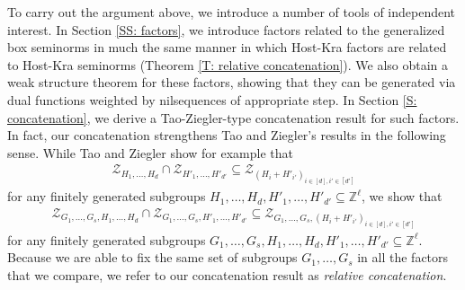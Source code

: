 \documentclass[11pt]{amsart}
\theoremstyle{definition}
\newcommand{\Z}{{\mathbb Z}}
\newcommand{\1}{{\mathbf{1}}}
\begin{document}
To carry out the argument above, we introduce a number of tools of independent interest. In Section \ref{SS: factors}, we introduce factors related to the generalized box seminorms in much the same manner in which Host-Kra factors are related to Host-Kra seminorms (Theorem \ref{T: relative concatenation}). We also obtain a weak structure theorem for these factors, showing that they can be generated via dual functions weighted by nilsequences of appropriate step. In Section \ref{S: concatenation}, we derive a Tao-Ziegler-type concatenation result for such factors. In fact, our concatenation strengthens Tao and Ziegler's results \cite{TZ16} in the following sense. While Tao and Ziegler show for example that 
\begin{align*}
    \mathcal{Z}_{H_{1},\dots,H_{d}}\cap \mathcal{Z}_{H'_{1},\dots,H'_{d'}}\subseteq \mathcal{Z}_{(H_{i}+H'_{i'})_{i\in[d], i'\in[d']}}
\end{align*}
for any finitely generated subgroups $H_1, \ldots, H_d, H'_1, \ldots, H'_{d'}\subseteq\Z^\ell$, we show that
\begin{align*}
    \mathcal{Z}_{G_{1},\dots,G_s,H_{1},\dots,H_{d}}\cap \mathcal{Z}_{G_{1},\dots,G_s,H'_{1},\dots,H'_{d'}}\subseteq \mathcal{Z}_{G_{1},\dots,G_{s},(H_{i}+H'_{i'})_{i\in[d], i'\in[d']}}
\end{align*}
for any finitely generated subgroups $G_1, \ldots, G_s, H_1, \ldots, H_d, H'_1, \ldots, H'_{d'}\subseteq\Z^\ell$. Because we are able to fix the same set of subgroups $G_1, \ldots, G_s$ in all the factors that we compare, we refer to our concatenation result as \textit{relative concatenation}.
\end{document}
